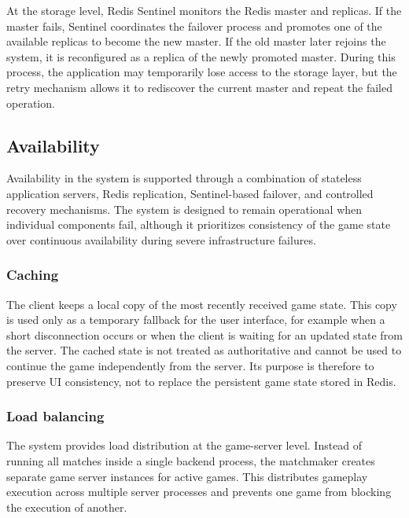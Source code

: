 \documentclass{scrartcl}
\begin{document}
  At the storage level, Redis Sentinel monitors the Redis master and replicas. 
  If the master fails, Sentinel coordinates the failover process and promotes one of the available replicas to become the new master. 
  If the old master later rejoins the system, it is reconfigured as a replica of the newly promoted master. 
  During this process, the application may temporarily lose access to the storage layer, but the retry mechanism allows it to rediscover the current master and repeat the failed operation.

\subsection{Availability}\label{availability}

Availability in the system is supported through a combination of stateless application servers, Redis replication, Sentinel-based failover, and controlled recovery mechanisms. 
The system is designed to remain operational when individual components fail, although it prioritizes consistency of the game state over continuous availability during severe infrastructure failures.

  \subsubsection{Caching}
    The client keeps a local copy of the most recently received game state. 
    This copy is used only as a temporary fallback for the user interface, for example when a short disconnection occurs or when the client is waiting for an updated state from the server. 
    The cached state is not treated as authoritative and cannot be used to continue the game independently from the server. 
    Its purpose is therefore to preserve UI consistency, not to replace the persistent game state stored in Redis.

  \subsubsection{Load balancing}
    The system provides load distribution at the game-server level. 
    Instead of running all matches inside a single backend process, the matchmaker creates separate game server instances for active games. 
    This distributes gameplay execution across multiple server processes and prevents one game from blocking the execution of another.
\end{document}
